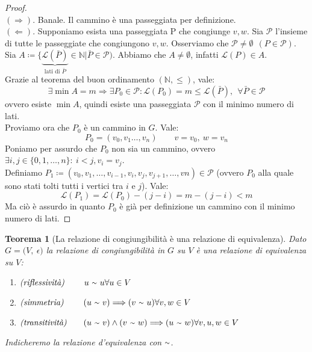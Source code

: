 \documentclass[12pt,twoside]{article}
\newcommand{\N}{\mathbb{N}}
\newcommand{\implica}{\Longrightarrow}
\newcommand{\Eps}{${\Large$\epsilon$}$}
\newcommand{\grafo}{(V, \: \Eps)}
\newcommand{\til}{\raise.17ex\hbox{$\scriptstyle\mathtt{\sim}$}}
\newtheorem{theorem}{Teorema}
\begin{document}
\begin{proof}\ \\
$(\implica)$. Banale. Il cammino è una passeggiata per definizione.\\
$(\Longleftarrow)$. Supponiamo esista una passeggiata P che congiunge $v, w$. Sia $\mathcal{P}$ l'insieme di tutte le passeggiate che congiungono $v, w$. Osserviamo che $\mathcal{P} \ne \emptyset \ \ (P \in \mathcal{P})$.\\
Sia $A \coloneqq \{ \underbrace{\mathcal{L}(\bar{P})}_{\text{lati di $\bar{P}$}} \in \N | \bar{P} \in \mathcal{P})$. Abbiamo che $A \ne \emptyset$, infatti $\mathcal{L}(P) \in A$.\\
Grazie al teorema del buon ordinamento $(\N, \le)$, vale:
$$ \exists \min A = m \implica \exists P_0 \in \mathcal{P} : \mathcal{L}(P_0) = m \le \mathcal{L}(\bar{P}),\ \ \forall \bar{P} \in \mathcal{P}$$
ovvero esiste $\min A$, quindi esiste una passeggiata $\mathcal{P}$ con il minimo numero di lati.\\
Proviamo ora che $P_0$ è un cammino in $G$. Vale:
$$ P_0 = (v_0, v_1\ldots, v_n)\qquad v = v_0,\ w = v_n$$
Poniamo per assurdo che $P_0$ non sia un cammino, ovvero $\exists i, j \in \{0, 1,\ldots, n\} : \ i < j, v_i = v_j$.\\
Definiamo $P_1 \coloneqq (v_0, v_1, \ldots , v_{i-1}, v_i, v_j, v_{j+1},\ldots, vn) \in \mathcal{P}$ (ovvero $P_0$ alla quale sono stati tolti tutti i vertici tra $i$ e $j$). Vale:
$$\mathcal{L}(P_1) = \mathcal{L}(P_0) - (j - i) = m - (j - i) < m$$
Ma ciò è assurdo in quanto $P_0$ è già per definizione un cammino con il minimo numero di lati.
\end{proof}

\begin{theorem}[La relazione di congiungibilità è una relazione di equivalenza]
Dato $G = \grafo$ la relazione di congiungibilità in $G$ su $V$ è una relazione di equivalenza su $V$:
\begin{enumerate}
\item$\textit{(riflessività) }\qquad u\ \til\ u \hfill \forall u \in V$
\item$\textit{(simmetria) }\qquad (u\ \til\ v) \implica (v\ \til\ u) \hfill \forall v, w \in V$
\item$\textit{(transitività)}\qquad (u\ \til\ v) \land (v\ \til\ w) \implica (u\ \til \ w) \hfill \forall v, u, w \in V$
\end{enumerate}
Indicheremo la relazione d'equivalenza con $\til$.
\end{theorem}
\end{document}
